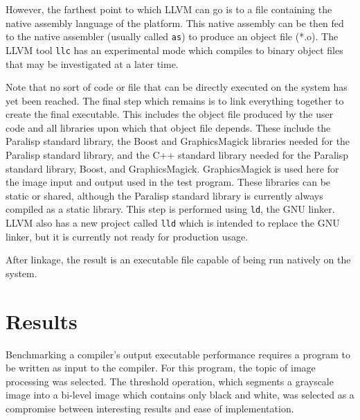 \documentclass[abstracton]{scrartcl}
\begin{document}
However, the farthest point to which LLVM can go is to a file containing the native assembly language of the platform. This native assembly can be then fed to the native assembler (usually called \texttt{as}) to produce an object file (*.o). The LLVM tool \texttt{llc} has an experimental mode which compiles to binary object files that may be investigated at a later time.

Note that no sort of code or file that can be directly executed on the system has yet been reached. The final step which remains is to link everything together to create the final executable. This includes the object file produced by the user code and all libraries upon which that object file depends. These include the Paralisp standard library, the Boost and GraphicsMagick libraries needed for the Paralisp standard library, and the C++ standard library needed for the Paralisp standard library, Boost, and GraphicsMagick. GraphicsMagick is used here for the image input and output used in the test program. These libraries can be static or shared, although the Paralisp standard library is currently always compiled as a static library. This step is performed using \texttt{ld}, the GNU linker. LLVM also has a new project called \texttt{lld} which is intended to replace the GNU linker, but it is currently not ready for production usage.

After linkage, the result is an executable file capable of being run natively on the system.

\section{Results}

Benchmarking a compiler's output executable performance requires a program to be written as input to the compiler. For this program, the topic of image processing was selected. The threshold operation, which segments a grayscale image into a bi-level image which contains only black and white, was selected as a compromise between interesting results and ease of implementation.
\end{document}
